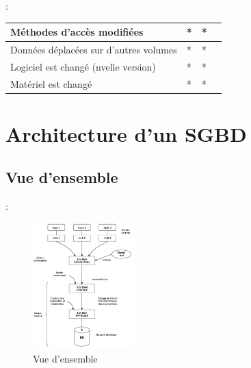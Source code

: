 \documentclass[10pt]{beamer}
\begin{document}
\begin{frame}{\subsecname : \subsubsecname}
\begin{table}[]
{\begin{tabular}{|l|l|l|l|}
                Méthodes d’accès modifiées                                                       & *                                 & *                                                        &                                                          \\ \hline
                Données déplacées sur d’autres volumes                                           & *                                 & *                                                        &                                                          \\ \hline
                Logiciel est changé (nvelle version)                                             & *                                 & *                                                        &                                                          \\ \hline
                Matériel est changé                                                              & *                                 & *                                                        &                                                          \\ \hline
            \end{tabular}}
    \end{table}
\end{frame}
\section{Architecture d’un SGBD}
\subsection{Vue d'ensemble}
\begin{frame}{\secname : \subsecname}
    \begin{figure}
        \begin{center}
            \includegraphics[width=0.35\textwidth]{../assets/img/architecture_sgbd--6.jpg}
            \caption{Vue d'ensemble}
            \label{Fig:architecture_sgbd--6}
        \end{center}
    \end{figure}
\end{frame}
\end{document}
